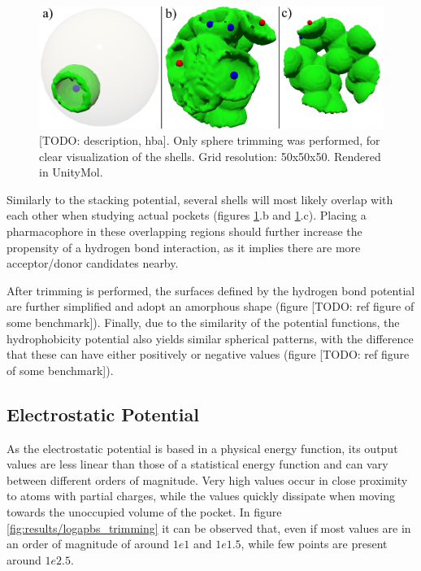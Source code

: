     \begin{figure}[H]
      \centering
      \includegraphics[width=1\textwidth]{figures/results/visualize_hbonds.png}
      \caption{\label{fig:results/visualize_hbonds} [TODO: description, hba]. Only sphere trimming was performed, for clear visualization of the shells. Grid resolution: 50x50x50. Rendered in UnityMol.}
    \end{figure}

    Similarly to the stacking potential, several shells will most likely overlap with each other when studying actual pockets (figures \ref{fig:results/visualize_hbonds}.b and \ref{fig:results/visualize_hbonds}.c). Placing a pharmacophore in these overlapping regions should further increase the propensity of a hydrogen bond interaction, as it implies there are more acceptor/donor candidates nearby.

    After trimming is performed, the surfaces defined by the hydrogen bond potential are further simplified and adopt an amorphous shape (figure [TODO: ref figure of some benchmark]). Finally, due to the similarity of the potential functions, the hydrophobicity potential also yields similar spherical patterns, with the difference that these can have either positively or negative values (figure [TODO: ref figure of some benchmark]).

  \subsection{Electrostatic Potential}
    As the electrostatic potential is based in a physical energy function, its output values are less linear than those of a statistical energy function and can vary between different orders of magnitude. Very high values occur in close proximity to atoms with partial charges, while the values quickly dissipate when moving towards the unoccupied volume of the pocket. In figure \ref{fig:results/logapbs_trimming} it can be observed that, even if most values are in an order of magnitude of around $1e1$ and $1e1.5$, while few points are present around $1e2.5$.

